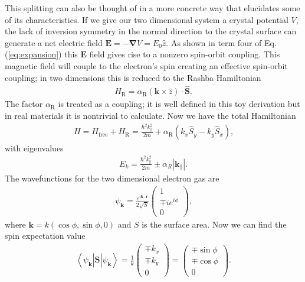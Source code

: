 \documentclass[12pt]{article}
\begin{document}
This splitting can also be thought of in a more concrete way that elucidates some of its characteristics.
If we give our two dimensional system a crystal potential $V$, the lack of inversion symmetry in the normal direction to the crystal surface can generate a net electric field $\boldsymbol{E}=-\boldsymbol{\nabla}V=E_0\hat{z}$.
As shown in term four of Eq. (\ref{eq:expansion}) this $\boldsymbol{E}$ field gives rise to a nonzero spin-orbit coupling.
This magnetic field will couple to the electron's spin creating an effective spin-orbit coupling; in two dimensions this is reduced to the Rashba Hamiltonian
\begin{align}
  \label{eq:rashba}
  H_{\text{R}}=\alpha_{\text{R}}(\boldsymbol{k}\times\hat{z})\cdot\hat{\boldsymbol{S}}\text{.}
\end{align}
The factor $\alpha_{\text{R}}$ is treated as a coupling; it is well defined in this toy derivation but in real materials it is nontrivial to calculate.
Now we have the total Hamiltonian
\begin{align}
  \label{eq:totalH}
  H=H_{\text{free}}+H_{\text{R}}=\frac{\hbar^2k_\parallel^2}{2m}+\alpha_{\text{R}}(k_x\hat{S}_y-k_y\hat{S}_x)\text{,}
\end{align}
with eigenvalues
\begin{align}
  \label{eq:eigenvalues}
  E_k=\frac{\hbar^2k_{\parallel}^2}{2m}\pm\alpha_{R}\left|\boldsymbol{k}_{\parallel}\right|\text{.}
\end{align}
The wavefunctions for the two dimensional electron gas are
\begin{align}
  \label{eq:wavefn}
  \psi_{\boldsymbol{k}}=\frac{e^{i\boldsymbol{k}\cdot\boldsymbol{r}}}{2\sqrt{S}}\left(\begin{array}{c} 1 \\ \mp ie^{i\phi} \\ 0 \end{array} \right)\text{,}
\end{align}
where $\boldsymbol{k}=k(\cos\phi,\sin\phi,0)$ and $S$ is the surface area.
Now we can find the spin expectation value
\begin{align}
  \label{eq:expectation}
  \left<\psi_{\boldsymbol{k}}\left|\hat{\boldsymbol{S}}\right|\psi_{\boldsymbol{k}}\right>=\frac{1}{k}\left(\begin{array}{c} \mp k_x \\ \mp k_y \\ 0 \end{array} \right) = \left(\begin{array}{c} \mp \sin\phi \\ \mp \cos\phi \\ 0 \end{array} \right)\text{.}
\end{align}
\end{document}

